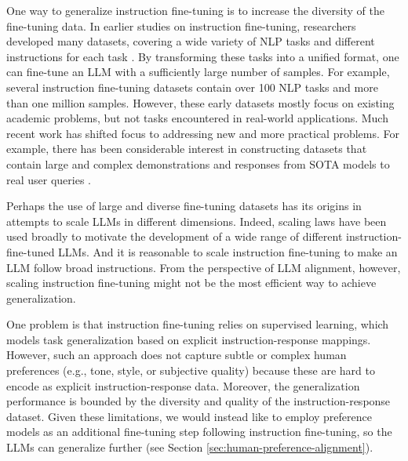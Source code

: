 One way to generalize instruction fine-tuning is to increase the diversity of the fine-tuning data. In earlier studies on instruction fine-tuning, researchers developed many datasets, covering a wide variety of NLP tasks and different instructions for each task \cite{wang-etal:2022super,sanh-etal:2022multitask,longpre-etal:2023flan}. By transforming these tasks into a unified format, one can fine-tune an LLM with a sufficiently large number of samples. For example, several instruction fine-tuning datasets contain over 100 NLP tasks and more than one million samples. However, these early datasets mostly focus on existing academic problems, but not tasks encountered in real-world applications. Much recent work has shifted focus to addressing new and more practical problems. For example, there has been considerable interest in constructing datasets that contain large and complex demonstrations and responses from SOTA models to real user queries \cite{wang-etal:2023far,teknium:2023openhermes}.

Perhaps the use of large and diverse fine-tuning datasets has its origins in attempts to scale LLMs in different dimensions. Indeed, scaling laws have been used broadly to motivate the development of a wide range of different instruction-fine-tuned LLMs. And it is reasonable to scale instruction fine-tuning to make an LLM follow broad instructions. From the perspective of LLM alignment, however, scaling instruction fine-tuning might not be the most efficient way to achieve generalization.

One problem is that instruction fine-tuning relies on supervised learning, which models task generalization based on explicit instruction-response mappings. However, such an approach does not capture subtle or complex human preferences (e.g., tone, style, or subjective quality) because these are hard to encode as explicit instruction-response data. Moreover, the generalization performance is bounded by the diversity and quality of the instruction-response dataset. Given these limitations, we would instead like to employ preference models as an additional fine-tuning step following instruction fine-tuning, so the LLMs can generalize further (see Section \ref{sec:human-preference-alignment}).

